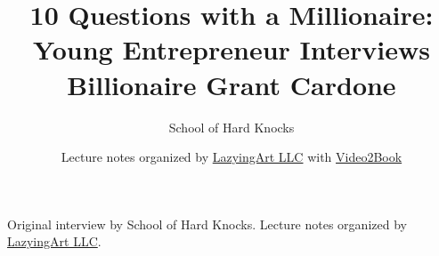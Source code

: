 \documentclass[11pt,oneside]{book}
\begin{document}
\frontmatter
\title{10 Questions with a Millionaire: Young Entrepreneur Interviews Billionaire Grant Cardone}
\author{School of Hard Knocks}
\date{Lecture notes organized by \href{https://lazying.art}{LazyingArt LLC} with \href{https://github.com/lachlanchen/Video2Book}{Video2Book}}
\maketitle
\begin{center}
\small Original interview by School of Hard Knocks. Lecture notes organized by \href{https://lazying.art}{LazyingArt LLC}.
\end{center}
\clearpage
\mainmatter

\end{document}
